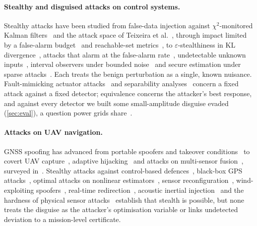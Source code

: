 \paragraph{Stealthy and disguised attacks on control systems.}
Stealthy attacks have been studied from false-data injection against
$\chi^2$-monitored Kalman filters~\cite{mo2010fdi,mo2009replay} and the attack
space of Teixeira et al.~\cite{teixeira2015}, through impact limited by a
false-alarm budget~\cite{urbina2016} and reachable-set
metrics~\cite{mo2016,murguia2020}, to $\varepsilon$-stealthiness in KL
divergence~\cite{bai2017}, attacks that alarm at the false-alarm
rate~\cite{hashemi2018}, undetectable unknown inputs~\cite{pasqualetti2013},
interval observers under bounded noise~\cite{degue2022} and secure estimation
under sparse attacks~\cite{mishra2015}. Each treats the benign perturbation as a
single, known nuisance. Fault-mimicking actuator attacks~\cite{roy2023} and
separability analyses~\cite{xue2025dual,li2026unified} concern a fixed attack
against a fixed detector; equivalence concerns the attacker's best response,
and against every detector we built some small-amplitude disguise evaded
(\cref{sec:eval}), a question power grids share~\cite{borgeshink2014,ghosh2024,ahsan2026,sayed2024gridchaos}.

\paragraph{Attacks on UAV navigation.}
GNSS spoofing has advanced from portable spoofers and takeover
conditions~\cite{humphreys2008,tippenhauer2011} to covert UAV
capture~\cite{kerns2014}, adaptive hijacking~\cite{noh2019} and attacks on
multi-sensor fusion~\cite{shen2020,zeng2018}, surveyed in~\cite{psiaki2016,zeng2026survey}.
Stealthy attacks against control-based defences~\cite{dash2019,dash2021dtrap},
black-box GPS attacks~\cite{khazraei2023,khazraei2024}, optimal attacks on
nonlinear estimators~\cite{hallyburton2022}, sensor
reconfiguration~\cite{erba2025}, wind-exploiting
spoofers~\cite{kim2024predictable}, real-time redirection~\cite{meng2026phantom},
acoustic inertial injection~\cite{son2015,trippel2017} and the hardness of
physical sensor attacks~\cite{kim2024hardness} establish that stealth is
possible, but none treats the disguise as the attacker's optimisation variable
or links undetected deviation to a mission-level certificate.

